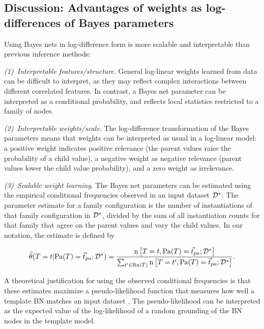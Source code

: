 \documentclass[twoside,11pt]{article}
\newcommand{\point}[1]{\noindent\emph{#1}.}
\begin{document}
\subsection{Discussion: Advantages of weights as log-differences of Bayes parameters}

Using Bayes nets in log-difference form is more scalable and interpretable than previous inference methods:

\point{(1)~Interpretable features/structure} General log-linear weights learned from data can be difficult to interpret, as they may reflect complex interactions between different correlated features. In contrast, a Bayes net parameter can be interpreted as a conditional probability, and reflects local statistics restricted to a family of nodes. 

\point{(2)~Interpretable weights/scale} The log-difference transformation of the Bayes parameters means that weights can be interpreted as usual in a log-linear model: a positive weight indicates positive relevance (the parent values raise the probability of a child value), a negative weight as negative relevance (parent values lower the child value probability), and a zero weight as irrelevance. 

\point{(3)~Scalable weight learning} The Bayes net parameters can be estimated using the empirical conditional frequencies observed in an input dataset $\mathcal{D}^{*}\hspace{0.0ex}$: The parameter estimate for a family configuration is the number of instantiations of that family configuration in $\mathcal{D}^{*}\hspace{0.0ex}$, divided by the sum of all instantiation counts for that family that agree on the parent values and vary the child values. In our notation, the estimate is defined by

\newcommand{\CTPa}{\Count{\Appendterm{\TT = \TV} {\Pa{\TT} = \Prange{\TT}}}  {\FG{\D}}}
\newcommand{\CTPb}{\Count{\Appendterm{\TT = \TV'} {\Pa{\TT} = \Prange{\TT}}}  {\FG{\D}}}

\begin{equation} \label{eq:frequencies}
\estcprob{\TT = \TV} {\Pa{\TT} = \Prange{\TT}} {\FG{\D}} = 
    \frac{\CTPa}
           {\sum_{\TV' \in \Range{\TT}}\CTPb}.
\end{equation}

A theoretical justification for using the observed conditional frequencies is that these estimates maximize a pseudo-likelihood function that measures how well a template BN matches an input dataset \cite{Schulte2011,Schulte2013}. The pseudo-likelihood can be interpreted as the expected value of the log-likelihood of a random grounding of the BN nodes in the template model.
\end{document}
